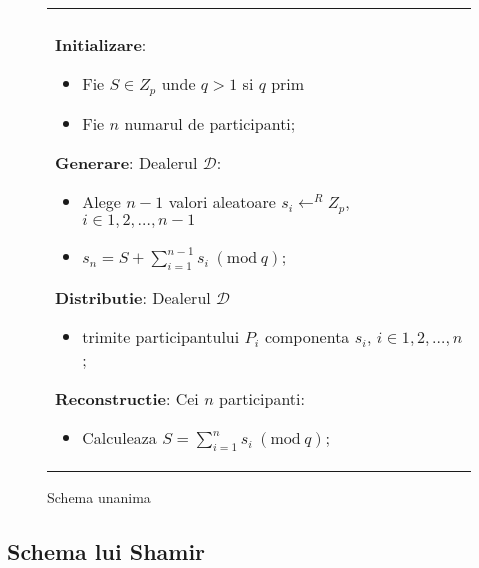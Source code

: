 \documentclass{llncs}
\newcommand{\Mod}[1]{\ (\text{mod}\ #1)}
\begin{document}
\begin{figure*}[h!]

\begin{tabular}{|p{\textwidth}|}
\hline

\\
\hspace{.1in}
\textbf{Initializare}: 
	\begin{itemize}
		\item Fie $S \in Z_p$ unde $q > 1 $ si $q$ prim
		\item Fie $n$ numarul de participanti;
	\end{itemize}
\medskip

\hspace{.1in}
\textbf{Generare}: Dealerul $\mathcal{D}$:
	\begin{itemize}
		\setlength{\itemsep}{5pt}
		\item Alege $n - 1$ valori aleatoare $s_i \leftarrow^R Z_p$, $i \in 1,2,\dots,{n-1}$
		\item $s_n = S + \sum_{i=1}^{n-1} s_i \Mod q $;
	\end{itemize}
\medskip

\hspace{.1in}
\textbf{Distributie}: Dealerul $\mathcal{D}$
	\begin{itemize}
		\item trimite participantului $P_i$ componenta $s_i$, $i \in 1,2,\dots,n$;
	\end{itemize}

\hspace{.1in}
\textbf{Reconstructie}: Cei $n$ participanti:
	\begin{itemize}
		\item Calculeaza $S = \sum_{i=1}^{n} s_i \Mod q$;
	\end{itemize}

\\
\hline
\end{tabular}
\caption{Schema unanima \cite{Karnin:83}}
\label{fig:all_or_nothing}
\end{figure*}




\subsection{Schema lui Shamir}
\end{document}
